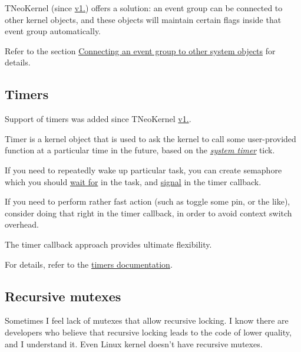 T\+Neo\+Kernel (since \hyperlink{changelog_changelog_v1_03}{v1.}) offers a solution\+: an event group can be connected to other kernel objects, and these objects will maintain certain flags inside that event group automatically.

Refer to the section \hyperlink{tn__eventgrp_8h_eventgrp_connect}{Connecting an event group to other system objects} for details.\hypertarget{tnkernel_diff_tnkernel_new_features__timer}{}\subsection{Timers}\label{tnkernel_diff_tnkernel_new_features__timer}
Support of timers was added since T\+Neo\+Kernel \hyperlink{changelog_changelog_v1_02}{v1.}.

Timer is a kernel object that is used to ask the kernel to call some user-\/provided function at a particular time in the future, based on the {\itshape \hyperlink{quick_guide_time_ticks}{system timer}} tick.

If you need to repeatedly wake up particular task, you can create semaphore which you should \hyperlink{tn__sem_8h_a6bf88a78f4f8b2799f72ee671b52ed97}{wait for} in the task, and \hyperlink{tn__sem_8h_a215fd97b86fc63192106bb30b0574d14}{signal} in the timer callback.

If you need to perform rather fast action (such as toggle some pin, or the like), consider doing that right in the timer callback, in order to avoid context switch overhead.

The timer callback approach provides ultimate flexibility.

For details, refer to the \hyperlink{tn__timer_8h}{timers documentation}.\hypertarget{tnkernel_diff_tnkernel_diff_mutex_rec}{}\subsection{Recursive mutexes}\label{tnkernel_diff_tnkernel_diff_mutex_rec}
Sometimes I feel lack of mutexes that allow recursive locking. I know there are developers who believe that recursive locking leads to the code of lower quality, and I understand it. Even Linux kernel doesn't have recursive mutexes.

